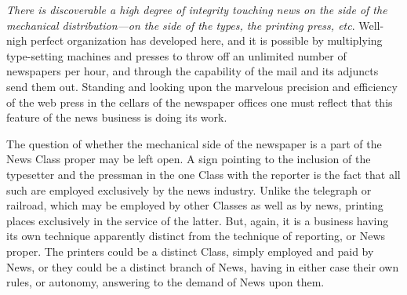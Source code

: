 \documentclass[openany,nobib]{tufte-book}
\begin{document}
\vspace{0.05in}

\emph{There is discoverable a high degree of integrity touching news on
the side of the mechanical distribution---on the side of the types, the
printing press, etc}. Well-nigh perfect organization has developed here,
and it is possible by multiplying type-setting machines and presses to
throw off an unlimited number of newspapers per hour, and through the
capability of the mail and its adjuncts send them out. Standing and
looking upon the marvelous precision and efficiency of the web press in
the cellars of the newspaper offices one must reflect that this feature
of the news business is doing its work.~

The question of whether the mechanical side of the newspaper is a part
of the News Class proper may be left open. A sign pointing to the
inclusion of the typesetter and the pressman in the one Class with the
reporter is the fact that all such are employed exclusively by the news
industry. Unlike the telegraph or railroad, which may be employed by
other Classes as well as by news, printing places exclusively in the
service of the latter. But, again, it is a business having its own
technique apparently distinct from the technique of reporting, or News
proper. The printers could be a distinct Class, simply employed and paid
by News, or they could be a distinct branch of News, having in either
case their own rules, or autonomy, answering to the demand of News upon
them.~

\vspace{0.05in}
\end{document}
